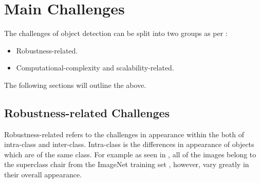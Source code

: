 \section{Main Challenges}\label{sec:probchallenges}
The challenges of object detection can be split into two groups as per \cite{zhang}:

\begin{itemize}
	\item Robustness-related.
	\item Computational-complexity and scalability-related.
\end{itemize}

The following sections will outline the above.

\subsection{Robustness-related Challenges}

Robustness-related refers to the challenges in appearance within the both of intra-class and inter-class. Intra-class is the differences in appearance of objects which are of the same class. For example as seen in , all of the images belong to the superclass chair from the ImageNet training set \cite{imagenet}, however, vary greatly in their overall appearance. 

